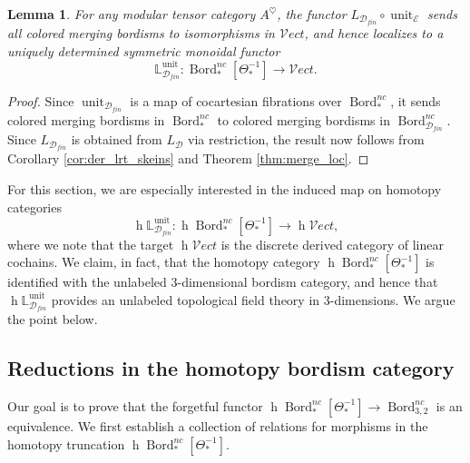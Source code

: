 \documentclass[reqno]{amsart}
\newtheorem{lemma}{Lemma}[section]
\theoremstyle{definition}
\newcommand{\mbb}[1]{\mathbb{#1}}
\newcommand{\msc}[1]{\mathscr{#1}}
\newcommand{\opn}[1]{\operatorname{#1}}
\newcommand{\Vect}{\msc{V}\!ect}
\DeclareMathOperator{\Bord}{Bord}
\renewcommand{\1}{\mathbf{1}}
\begin{document}
\begin{lemma}\label{lem:lrt_unit}
For any modular tensor category $A^{\heartsuit}$, the functor $L_{\msc{D}_{fin}}\circ\opn{unit}_{\msc{E}}$ sends all colored merging bordisms to isomorphisms in $\Vect$, and hence localizes to a uniquely determined symmetric monoidal functor
\[
\mbb{L}^{\opn{unit}}_{\msc{D}_{fin}}:\Bord_{\ast}^{nc}[\Theta^{-1}_{\ast}]\to \Vect.
\]
\end{lemma}

\begin{proof}
Since $\opn{unit}_{\msc{D}_{fin}}$ is a map of cocartesian fibrations over $\Bord_{\ast}^{nc}$, it sends colored merging bordisms in $\Bord_{\ast}^{nc}$ to colored merging bordisms in $\Bord_{\msc{D}_{fin}}^{nc}$.  Since $L_{\msc{D}_{fin}}$ is obtained from $L_{\msc{D}}$ via restriction, the result now follows from Corollary \ref{cor:der_lrt_skeins} and Theorem \ref{thm:merge_loc}.
\end{proof}

For this section, we are especially interested in the induced map on homotopy categories
\[
\opn{h}\mbb{L}^{\opn{unit}}_{\msc{D}_{fin}}:\opn{h}\Bord_{\ast}^{nc}[\Theta^{-1}_{\ast}]\to \opn{h}\Vect,
\]
where we note that the target $\opn{h}\Vect$ is the discrete derived category of linear cochains.  We claim, in fact, that the homotopy category $\opn{h}\Bord^{nc}_{\ast}[\Theta_{\ast}^{-1}]$ is identified with the unlabeled $3$-dimensional bordism category, and hence that $\opn{h}\mbb{L}^{\opn{unit}}_{\msc{D}_{fin}}$ provides an unlabeled topological field theory in $3$-dimensions. We argue the point below.

\subsection{Reductions in the homotopy bordism category}

Our goal is to prove that the forgetful functor $\opn{h}\Bord_{\ast}^{nc}[\Theta_{\ast}^{-1}]\to \Bord^{nc}_{3,2}$ is an equivalence. We first establish a collection of relations for morphisms in the homotopy truncation $\opn{h}\Bord_{\ast}^{nc}[\Theta^{-1}_{\ast}]$.
\end{document}
